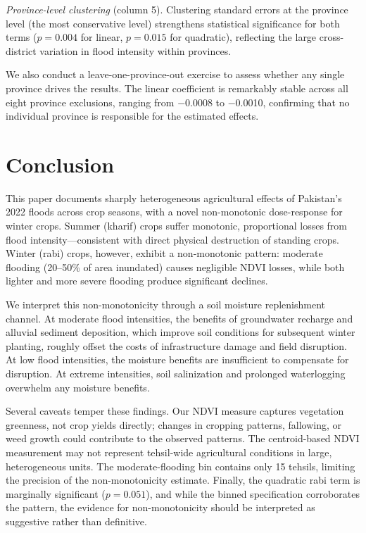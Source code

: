 \documentclass[12pt]{article}
\begin{document}
\textit{Province-level clustering} (column 5). Clustering standard errors at the province level (the most conservative level) strengthens statistical significance for both terms ($p = 0.004$ for linear, $p = 0.015$ for quadratic), reflecting the large cross-district variation in flood intensity within provinces.

We also conduct a leave-one-province-out exercise to assess whether any single province drives the results. The linear coefficient is remarkably stable across all eight province exclusions, ranging from $-$0.0008 to $-$0.0010, confirming that no individual province is responsible for the estimated effects.



\label{apep_main_text_end}

\section{Conclusion}\label{sec:conclusion}

This paper documents sharply heterogeneous agricultural effects of Pakistan's 2022 floods across crop seasons, with a novel non-monotonic dose-response for winter crops. Summer (kharif) crops suffer monotonic, proportional losses from flood intensity---consistent with direct physical destruction of standing crops. Winter (rabi) crops, however, exhibit a non-monotonic pattern: moderate flooding (20--50\% of area inundated) causes negligible NDVI losses, while both lighter and more severe flooding produce significant declines.

We interpret this non-monotonicity through a soil moisture replenishment channel. At moderate flood intensities, the benefits of groundwater recharge and alluvial sediment deposition, which improve soil conditions for subsequent winter planting, roughly offset the costs of infrastructure damage and field disruption. At low flood intensities, the moisture benefits are insufficient to compensate for disruption. At extreme intensities, soil salinization and prolonged waterlogging overwhelm any moisture benefits.

Several caveats temper these findings. Our NDVI measure captures vegetation greenness, not crop yields directly; changes in cropping patterns, fallowing, or weed growth could contribute to the observed patterns. The centroid-based NDVI measurement may not represent tehsil-wide agricultural conditions in large, heterogeneous units. The moderate-flooding bin contains only 15 tehsils, limiting the precision of the non-monotonicity estimate. Finally, the quadratic rabi term is marginally significant ($p = 0.051$), and while the binned specification corroborates the pattern, the evidence for non-monotonicity should be interpreted as suggestive rather than definitive.
\end{document}
